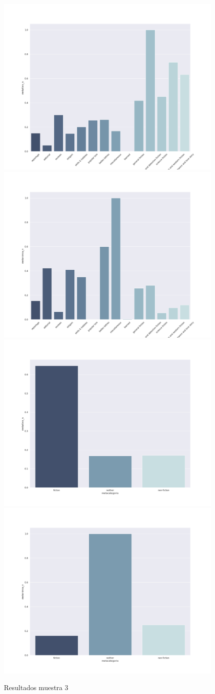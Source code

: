\documentclass[twoside]{article}
\begin{document}
\begin{figure}[!H]
\centering
\includegraphics[width=.45\linewidth]{./resultados/graphs/muestra/c3_metafora.png}
\includegraphics[width=.45\linewidth]{./resultados/graphs/muestra/c3_metonimia.png}
\includegraphics[width=.45\linewidth]{./resultados/graphs/meta/c3_metacategoria_metafora.png}
\includegraphics[width=.45\linewidth]{./resultados/graphs/meta/c3_metacategoria_metonimia.png}
\caption{\label{fig:c3_resultados}Resultados muestra 3}
\end{figure}
\end{document}
